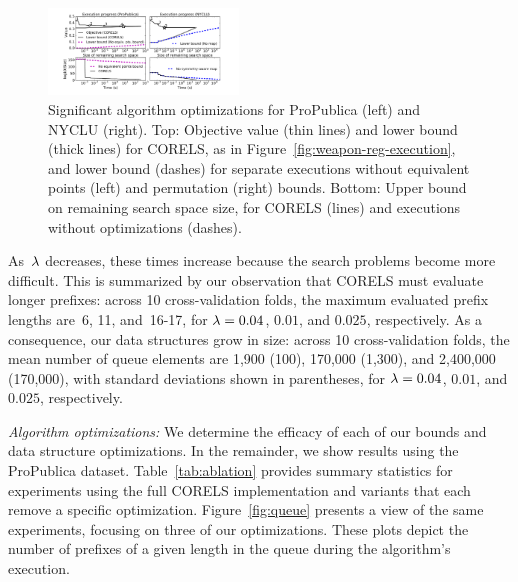 \begin{figure}[t!]
\begin{center}
\includegraphics[trim={30mm 15mm 35mm 5mm}, width=0.45\textwidth]{figs/weapon_execution-remaining-space.pdf}
\end{center}
\vspace{-2mm}
\caption{Significant algorithm optimizations
for ProPublica (left) and NYCLU (right).
%
Top: Objective value (thin lines) and lower bound (thick lines) for CORELS,
as in Figure~\ref{fig:weapon-reg-execution},
and lower bound (dashes) for separate executions without
equivalent points (left) and permutation (right) bounds.
%
Bottom: Upper bound on remaining search space size,
for CORELS (lines) and executions without optimizations (dashes).
}
\label{fig:objective}
\end{figure}

As~${\lambda}$ decreases, these times increase because the search problems become more difficult.
%
This is summarized by our observation that CORELS must evaluate longer prefixes:
across 10 cross-validation folds, the maximum evaluated prefix lengths are~6,
11, and~16-17, for ${{\lambda} = 0.04}$, $0.01$, and $0.025$, respectively.
%
As a consequence, our data structures grow in size: \eg
across 10 cross-validation folds, the mean number of queue elements are
1,900 (100), 170,000 (1,300), and 2,400,000 (170,000),
with standard deviations shown in parentheses,
for ${{\lambda} = 0.04}$, $0.01$, and $0.025$, respectively.


\textit{Algorithm optimizations:}
We determine the efficacy of each of our bounds and data structure optimizations.
%
In the remainder, we show results using the ProPublica dataset.
%
Table~\ref{tab:ablation} provides summary statistics for experiments using
the full CORELS implementation and variants that each remove a specific optimization.
%
Figure~\ref{fig:queue} presents a view of the same experiments, focusing
on three of our optimizations. These plots depict the number of
prefixes of a given length in the queue during the algorithm's execution.

